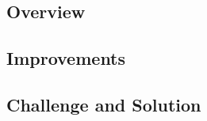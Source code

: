 \newcommand{\code}[1]{\texttt{#1}}

\subsection{Overview}

\subsection{Improvements}

\subsection{Challenge and Solution}
